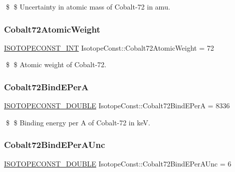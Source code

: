 \$ \$ Uncertainty in atomic mass of Cobalt-\/72 in amu. \mbox{\label{group___isotope_const-_cobalt-_co72_gae9b10897f1d5ac8c59aacc0845a3721a}} 
\subsubsection{\texorpdfstring{Cobalt72\+Atomic\+Weight}{Cobalt72AtomicWeight}}
{\footnotesize\ttfamily \mbox{\hyperlink{group___isotope_const-_macros_ga5f18360b3e99483a35c32d789e62621c}{I\+S\+O\+T\+O\+P\+E\+C\+O\+N\+S\+T\+\_\+\+I\+NT}} Isotope\+Const\+::\+Cobalt72\+Atomic\+Weight = 72}

\$ \$ Atomic weight of Cobalt-\/72. \mbox{\label{group___isotope_const-_cobalt-_co72_gaceef362ad98641a3be2a8e4990cb2648}} 
\subsubsection{\texorpdfstring{Cobalt72\+Bind\+E\+PerA}{Cobalt72BindEPerA}}
{\footnotesize\ttfamily \mbox{\hyperlink{group___isotope_const-_macros_ga8f45a7272ce02c0b4c65c44636ed719a}{I\+S\+O\+T\+O\+P\+E\+C\+O\+N\+S\+T\+\_\+\+D\+O\+U\+B\+LE}} Isotope\+Const\+::\+Cobalt72\+Bind\+E\+PerA = 8336}

\$ \$ Binding energy per A of Cobalt-\/72 in keV. \mbox{\label{group___isotope_const-_cobalt-_co72_ga4f759b68299690ebd5b30c801bae1f52}} 
\subsubsection{\texorpdfstring{Cobalt72\+Bind\+E\+Per\+A\+Unc}{Cobalt72BindEPerAUnc}}
{\footnotesize\ttfamily \mbox{\hyperlink{group___isotope_const-_macros_ga8f45a7272ce02c0b4c65c44636ed719a}{I\+S\+O\+T\+O\+P\+E\+C\+O\+N\+S\+T\+\_\+\+D\+O\+U\+B\+LE}} Isotope\+Const\+::\+Cobalt72\+Bind\+E\+Per\+A\+Unc = 6}

